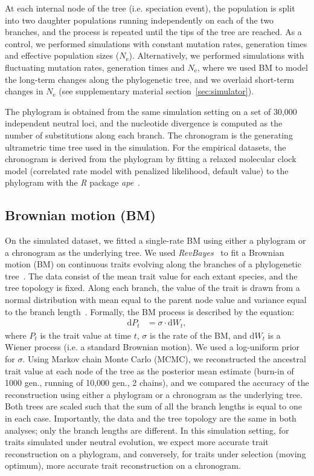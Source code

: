 \documentclass{article}
\newcommand{\Multiply}{\cdot}
\newcommand{\der}{\mathrm{d}}
\newcommand{\Ne}{N_{\text{e}}}
\newcommand{\Trait}{P}
\begin{document}
At each internal node of the tree (i.e. speciation event), the population is split into two daughter populations running independently on each of the two branches, and the process is repeated until the tips of the tree are reached.
As a control, we performed simulations with constant mutation rates, generation times and effective population sizes ($\Ne$).
Alternatively, we performed simulations with fluctuating mutation rates, generation times and $\Ne$, where we used BM to model the long-term changes along the phylogenetic tree, and we overlaid short-term changes in $\Ne$ (see supplementary material section~\ref{sec:simulator}).

The phylogram is obtained from the same simulation setting on a set of 30,000 independent neutral loci, and the nucleotide divergence is computed as the number of substitutions along each branch.
The chronogram is the generating ultrametric time tree used in the simulation.
For the empirical datasets, the chronogram is derived from the phylogram by fitting a relaxed molecular clock model (correlated rate model with penalized likelihood, default value) to the phylogram with the \textit{R} package \textit{ape}~\citep{paradis_ape_2004}.

\subsection*{Brownian motion (BM)}
On the simulated dataset, we fitted a single-rate BM using either a phylogram or a chronogram as the underlying tree.
We used \textit{RevBayes}~\citep{hohna_revbayes_2016} to fit a Brownian motion (BM) on continuous traits evolving along the branches of a phylogenetic tree~\citep{felsenstein_phylogenies_1985, felsenstein_phylogenies_1988a}.
The data consist of the mean trait value for each extant species, and the tree topology is fixed.
Along each branch, the value of the trait is drawn from a normal distribution with mean equal to the parent node value and variance equal to the branch length~\citep{felsenstein_phylogenies_1985}.
Formally, the BM process is described by the equation:
\begin{align}
    \der \Trait_t & = \sigma \Multiply \der W_t,  \label{eq:bm-process}
\end{align}
where $\Trait_t$ is the trait value at time $t$, $\sigma$ is the rate of the BM, and $\der W_t$ is a Wiener process (i.e. a standard Brownian motion).
We used a log-uniform prior for $\sigma$.
Using Markov chain Monte Carlo (MCMC), we reconstructed the ancestral trait value at each node of the tree as the posterior mean estimate (burn-in of 1000 gen., running of 10,000 gen., 2 chains), and we compared the accuracy of the reconstruction using either a phylogram or a chronogram as the underlying tree.
Both trees are scaled such that the sum of all the branch lengths is equal to one in each case.
Importantly, the data and the tree topology are the same in both analyses; only the branch lengths are different.
In this simulation setting, for traits simulated under neutral evolution, we expect more accurate trait reconstruction on a phylogram, and conversely, for traits under selection (moving optimum), more accurate trait reconstruction on a chronogram.
\end{document}
